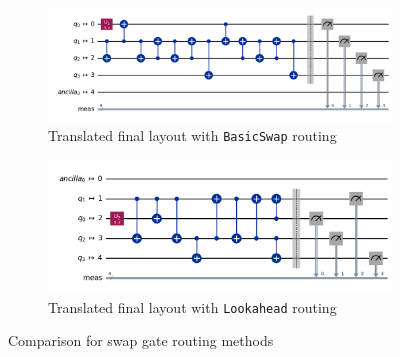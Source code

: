 \begin{figure}[htb]
    \centering
    \begin{subfigure}{0.8\linewidth}
        \includegraphics[width=\linewidth]{image/final_trivial_basic.png}
        \caption{Translated final layout with \lstinline{BasicSwap} routing}
        \label{fig:routing-basic-swap}
    \end{subfigure}
    \begin{subfigure}{0.8\linewidth}
        \includegraphics[width=\linewidth]{image/final_lookahead.png}
        \caption{Translated final layout with \lstinline{Lookahead} routing}
        \label{fig:routing-lookahead}
    \end{subfigure}
    \caption{Comparison for swap gate routing methods}
\end{figure}

